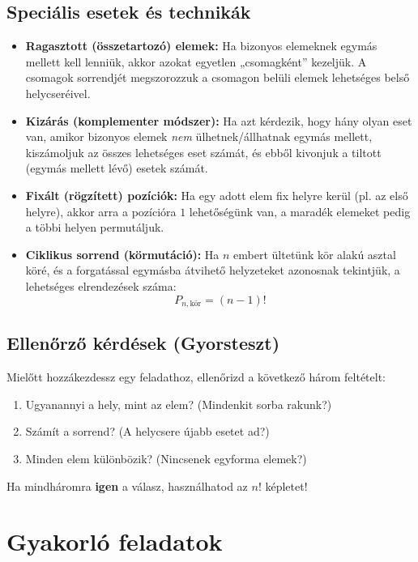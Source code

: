 \documentclass[12pt,a4paper]{article}
\begin{document}
\subsection{Speciális esetek és technikák}
\begin{itemize}
    \item \textbf{Ragasztott (összetartozó) elemek:} Ha bizonyos elemeknek egymás mellett kell lenniük, akkor azokat egyetlen „csomagként” kezeljük. A csomagok sorrendjét megszorozzuk a csomagon belüli elemek lehetséges belső helycseréivel.
    \item \textbf{Kizárás (komplementer módszer):} Ha azt kérdezik, hogy hány olyan eset van, amikor bizonyos elemek \emph{nem} ülhetnek/állhatnak egymás mellett, kiszámoljuk az összes lehetséges eset számát, és ebből kivonjuk a tiltott (egymás mellett lévő) esetek számát.
    \item \textbf{Fixált (rögzített) pozíciók:} Ha egy adott elem fix helyre kerül (pl. az első helyre), akkor arra a pozícióra $1$ lehetőségünk van, a maradék elemeket pedig a többi helyen permutáljuk.
    \item \textbf{Ciklikus sorrend (körmutáció):} Ha $n$ embert ültetünk kör alakú asztal köré, és a forgatással egymásba átvihető helyzeteket azonosnak tekintjük, a lehetséges elrendezések száma:
    \begin{equation}
        P_{n,\text{kör}} = (n - 1)!
    \end{equation}
\end{itemize}

\subsection{Ellenőrző kérdések (Gyorsteszt)}
Mielőtt hozzákezdessz egy feladathoz, ellenőrizd a következő három feltételt:
\begin{enumerate}
    \item Ugyanannyi a hely, mint az elem? (Mindenkit sorba rakunk?)
    \item Számít a sorrend? (A helycsere újabb esetet ad?)
    \item Minden elem különbözik? (Nincsenek egyforma elemek?)
\end{enumerate}
Ha mindháromra \textbf{igen} a válasz, használhatod az $n!$ képletet!

\newpage

\section{Gyakorló feladatok}
\end{document}
